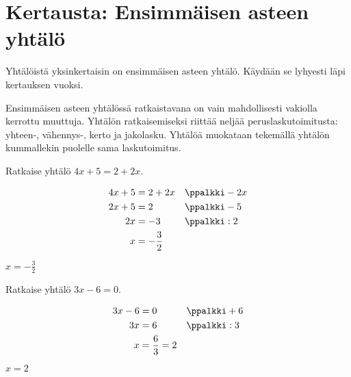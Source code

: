 \section{Kertausta: Ensimmäisen asteen yhtälö}

Yhtälöistä yksinkertaisin on ensimmäisen asteen yhtälö. Käydään se lyhyesti
läpi kertauksen vuoksi.

Ensimmäisen asteen yhtälössä ratkaistavana on vain mahdollisesti vakiolla
kerrottu muuttuja. Yhtälön ratkaisemiseksi riittää neljää
peruslaskutoimitusta: yhteen-, vähennys-, kerto ja jakolasku. 
Yhtälöä muokataan tekemällä yhtälön kummallekin puolelle sama laskutoimitus.




\begin{esimerkki}
Ratkaise yhtälö $4x + 5 = 2 + 2x$.

\begin{esimratk}
\begin{align*}
    4x + 5 &= 2 + 2x && \ppalkki -2x \\
    2x + 5 &= 2      && \ppalkki -5 \\
        2x &= -3     && \ppalkki :2 \\
         x &= -\frac{3}{2}
 \end{align*}
\end{esimratk}
\begin{esimvast}
$x=-\frac{3}{2}$
\end{esimvast}
\end{esimerkki}

\begin{esimerkki}
Ratkaise yhtälö $3x - 6 = 0$.

\begin{esimratk}
  \begin{align*}
    3x - 6 &= 0 && \ppalkki +6 \\
        3x &= 6 && \ppalkki :3 \\
         x &= \frac{6}{3}  = 2 \\
  \end{align*}
\end{esimratk}
\begin{esimvast}
$x=2$
\end{esimvast}
\end{esimerkki}

